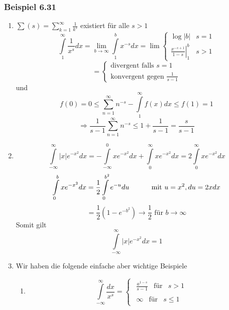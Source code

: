 \subsubsection*{Beispiel 6.31}%
\begin{enumerate}
\item $\sum {(s) = \sum\limits_{k = 1}^\infty  {\frac{1}{{{k^s}}}} } $ existiert für alle $s>1$ 
$$\int\limits_1^\infty  {\frac{1}{{{x^s}}}dx}  = \mathop {\lim }\limits_{b \to \infty } \int\limits_1^b {{x^{ - s}}dx}  = \lim \left\{ {\begin{array}{*{20}{c}}
{\log \left| b \right|}&{s = 1}\\
{\left. {\frac{{{x^{ - s + 1}}}}{{1 - s}}} \right|_1^b}&{s > 1}
\end{array}} \right. $$$$= \left\{ {\begin{array}{*{20}{c}}
{\text{divergent falls }s = 1}\\
{\text{konvergent gegen }\frac{1}{{s - 1}}}
\end{array}} \right.$$
und
$$f(0) = 0 \le \sum\limits_{n = 1}^\infty  {{n^{ - s}}}  - \int\limits_1^\infty  {f(x)dx}  \le f(1) = 1$$$$ \Rightarrow \frac{1}{{s - 1}}\sum\limits_{n = 1}^\infty  {{n^{ - s}}}  \le 1 + \frac{1}{{s - 1}} = \frac{s}{{s - 1}}$$
\item \[\int\limits_{ - \infty }^\infty  {\left| x \right|{e^{ - {x^2}}}dx}  =  - \int\limits_{ - \infty }^0 {x{e^{ - {x^2}}}dx}  + \int\limits_0^\infty  {x{e^{ - {x^2}}}dx}  = 2\int\limits_0^\infty  {x{e^{ - {x^2}}}dx} \]
\[\int\limits_0^b {x{e^{ - {x^2}}}dx = \frac{1}{2}\int\limits_0^{{b^2}} {{e^{ - u}}du} }\text{\hspace{10mm} mit }u=x^2, du=2xdx \]
\[ = \frac{1}{2}\left( {1 - {e^{ - {b^2}}}} \right) \to \frac{1}{2}\text{ für }b\rightarrow \infty\]
Somit gilt \[\int\limits_{ - \infty }^\infty  {\left| x \right|{e^{ - {x^2}}}dx = 1} \]
\item Wir haben die folgende einfache aber wichtige Beispiele
\begin{enumerate}
\item \[\int\limits_{ - \infty }^\infty  {\frac{{dx}}{{{x^s}}}}  = \left\{ {\begin{array}{*{20}{c}}
{\begin{array}{*{20}{c}}
{\frac{{{a^{1 - s}}}}{{s - 1}}}&\text{für}&{s > 1}
\end{array}}\\
{\begin{array}{*{20}{c}}
\infty &{{\text{für}}}&{s \le 1}
\end{array}}
\end{array}} \right.\]


\end{enumerate}
\end{enumerate}
